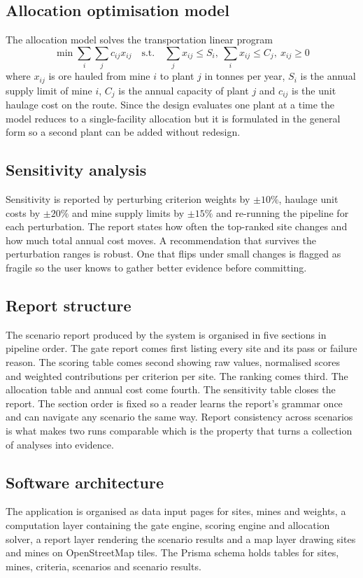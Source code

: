 \documentclass[12pt,a4paper]{report}
\begin{document}
\subsection{Allocation optimisation model}
The allocation model solves the transportation linear program
\[
\min \sum_{i} \sum_{j} c_{ij} x_{ij}
\quad\text{s.t.}\quad
\sum_j x_{ij} \le S_i,\ \sum_i x_{ij} \le C_j,\ x_{ij} \ge 0
\]
where $x_{ij}$ is ore hauled from mine $i$ to plant $j$ in tonnes per
year, $S_i$ is the annual supply limit of mine $i$, $C_j$ is the
annual capacity of plant $j$ and $c_{ij}$ is the unit haulage cost on
the route. Since the design evaluates one plant at a time the model
reduces to a single-facility allocation but it is formulated in the
general form so a second plant can be added without redesign.

\subsection{Sensitivity analysis}
Sensitivity is reported by perturbing criterion weights by $\pm 10\%$,
haulage unit costs by $\pm 20\%$ and mine supply limits by $\pm 15\%$
and re-running the pipeline for each perturbation. The report states
how often the top-ranked site changes and how much total annual cost
moves. A recommendation that survives the perturbation ranges is
robust. One that flips under small changes is flagged as fragile so
the user knows to gather better evidence before committing.

\subsection{Report structure}
The scenario report produced by the system is organised in five
sections in pipeline order. The gate report comes first listing every
site and its pass or failure reason. The scoring table comes second
showing raw values, normalised scores and weighted contributions per
criterion per site. The ranking comes third. The allocation table and
annual cost come fourth. The sensitivity table closes the report. The
section order is fixed so a reader learns the report's grammar once
and can navigate any scenario the same way. Report consistency across
scenarios is what makes two runs comparable which is the property
that turns a collection of analyses into evidence.

\subsection{Software architecture}
The application is organised as data input pages for sites, mines and
weights, a computation layer containing the gate engine, scoring
engine and allocation solver, a report layer rendering the scenario
results and a map layer drawing sites and mines on OpenStreetMap
tiles. The Prisma schema holds tables for sites, mines, criteria,
scenarios and scenario results.
\end{document}
